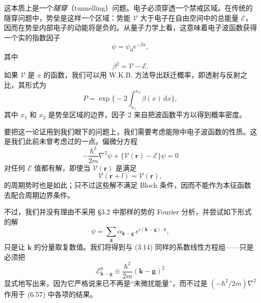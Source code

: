 

这本质上是一个\emph{隧穿}（tunnelling）问题。电子必须穿透一个禁戒区域。在传统的隧穿问题中，势垒是这样一个区域：势能 $\mathcal{V}$ 大于电子在自由空间中的总能量 $\mathcal{E}$，因而在势垒内部电子的动能将是负的。从量子力学上看，这意味着电子波函数获得一个实的指数因子
\begin{equation*}
\psi=\psi_{0}e^{-\beta x}, \tag{6.52}
\end{equation*}
其中
\begin{equation*}
\beta^{2}=\mathcal{V}-\mathcal{E}. \tag{6.53}
\end{equation*}
如果 $\mathcal{V}$ 是 $x$ 的函数，我们可以用 W.K.B. 方法导出跃迁概率，即透射与反射之比，其形式为
\begin{equation*}
P=\exp\Biggl\{-2\int_{x_{1}}^{x_{2}}\beta(x)\,\mathrm{d}x\Biggr\}, \tag{6.54}
\end{equation*}
其中 $x_{1}$ 和 $x_{2}$ 是势垒区域的边界，因子 2 来自把波函数平方以得到概率密度。

要把这一论证用到我们眼下的问题上，我们需要考虑能隙中电子波函数的性质。这是我们此前未曾考虑过的一点。偏微分方程
\begin{equation*}
-\frac{\hbar^{2}}{2m}\nabla^{2}\psi+\bigl\{\mathcal{V}(\mathbf{r})-\mathcal{E}\bigr\}\psi=0 \tag{6.55}
\end{equation*}
对任何 $\mathcal{E}$ 值都有解，即使当 $\mathcal{V}(\mathbf{r})$ 是满足
\begin{equation*}
\mathcal{V}(\mathbf{r}+l)=\mathcal{V}(\mathbf{r}), \tag{6.56}
\end{equation*}
的周期势时也是如此；只不过这些解不满足 Bloch 条件，因而不能作为本征函数去配合周期边界条件。

不过，我们并没有理由不采用 §3.2 中那样的势的 Fourier 分析，并尝试如下形式的解
\begin{equation*}
\psi=\sum_{\mathbf{g}}\alpha_{\mathbf{k}-\mathbf{g}}\,e^{i(\mathbf{k}-\mathbf{g})\cdot\mathbf{r}}, \tag{6.57}
\end{equation*}
只是让 $\mathbf{k}$ 的分量取复数值。我们将得到与 (3.14) 同样的系数线性方程组——只是必须把
\begin{equation*}
\mathcal{E}^{0}_{\mathbf{k}-\mathbf{g}}\equiv\frac{\hbar^{2}}{2m}(\mathbf{k}-\mathbf{g})^{2} \tag{6.58}
\end{equation*}
显式地写出来，因为它严格说来已不再是“未微扰能量”，而不过是 $(-\hbar^{2}/2m)\nabla^{2}$ 作用于 (6.57) 中各项的结果。

